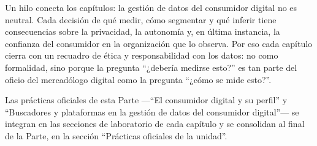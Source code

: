Un hilo conecta los capítulos: la gestión de datos del consumidor
digital no es neutral. Cada decisión de qué medir, cómo segmentar y qué
inferir tiene consecuencias sobre la privacidad, la autonomía y, en última
instancia, la confianza del consumidor en la organización que lo observa. Por
eso cada capítulo cierra con un recuadro de ética y responsabilidad con los
datos: no como formalidad, sino porque la pregunta \enquote{¿debería medirse esto?}
es tan parte del oficio del mercadólogo digital como la pregunta \enquote{¿cómo se
mide esto?}.

Las prácticas oficiales de esta Parte —\enquote{El consumidor digital y su perfil} y
\enquote{Buscadores y plataformas en la gestión de datos del consumidor digital}— se
integran en las secciones de laboratorio de cada capítulo y se consolidan al
final de la Parte, en la sección \enquote{Prácticas oficiales de la unidad}.
